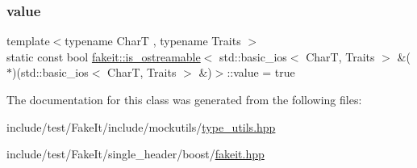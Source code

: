 \subsubsection{\texorpdfstring{value}{value}}
{\footnotesize\ttfamily template$<$typename CharT , typename Traits $>$ \\
static const bool \mbox{\hyperlink{classfakeit_1_1is__ostreamable}{fakeit\+::is\+\_\+ostreamable}}$<$ std\+::basic\+\_\+ios$<$ CharT, Traits $>$ \&($\ast$)(std\+::basic\+\_\+ios$<$ CharT, Traits $>$ \&)$>$\+::value = true\hspace{0.3cm}{\ttfamily [static]}}



The documentation for this class was generated from the following files\+:\begin{DoxyCompactItemize}
\item 
include/test/\+Fake\+It/include/mockutils/\mbox{\hyperlink{type__utils_8hpp}{type\+\_\+utils.\+hpp}}\item 
include/test/\+Fake\+It/single\+\_\+header/boost/\mbox{\hyperlink{single__header_2boost_2fakeit_8hpp}{fakeit.\+hpp}}\end{DoxyCompactItemize}
